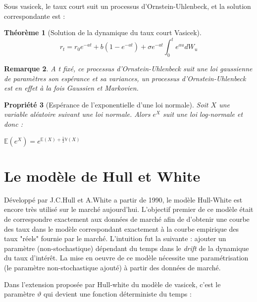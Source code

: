 \documentclass[11pt]{article}
\newtheorem{theorem}{Théorème}
\newtheorem{property}[theorem]{Propriété}
\newtheorem{remark}[theorem]{Remarque}
\let\vega\vartheta
\begin{document}
Sous vasicek, le taux court suit un processus d'Ornstein-Uhlenbeck, et la solution correspondante est : 
\begin{theorem}[Solution de la dynamique du taux court Vasicek]
\begin{displaymath}
r_t = r_0 e^{-at} + b(1-e^{-at}) + \sigma e^{-at} \int_0^t e^{au} dW_u
\end{displaymath}
\end{theorem}

\begin{remark} \label{O-U}
A t fixé, ce processus d'Ornstein-Uhlenbeck suit une loi gaussienne de paramètres son espérance et sa variances, un processus d'Ornstein-Uhlenbeck est en effet à la fois Gaussien et Markovien. 
\end{remark}

\begin{property}[Espérance de l'exponentielle d'une loi normale]
Soit $X$ une variable aléatoire suivant une loi normale. Alors $e^X$ suit une loi log-normale et donc :
\begin{center}
$\mathbb{E}(e^X) = e^{\mathbb{E}(X) + \frac{1}{2} \mathbb{V}(X)}$
\end{center}
\end{property}









\section{Le modèle de Hull et White}
Développé par J.C.Hull et A.White a partir de 1990, le modèle Hull-White est encore très utilisé sur le marché aujourd'hui. L'objectif premier de ce modèle était de correspondre exactement aux données de marché afin de d'obtenir une courbe des taux dans le modèle correspondant exactement à la courbe empirique des taux "réels" fournie par le marché. L'intuition fut la suivante : ajouter un paramètre (non-stochastique) dépendant du temps dans le \emph{drift} de la dynamique du taux d'intérêt. La mise en oeuvre de ce modèle nécessite une paramétrisation (le paramètre non-stochastique ajouté) à partir des données de marché. 



Dans l'extension proposée par Hull-white du modèle de vasicek, c'est le paramètre $\vega$ qui devient une fonction déterministe du temps : 
\end{document}
